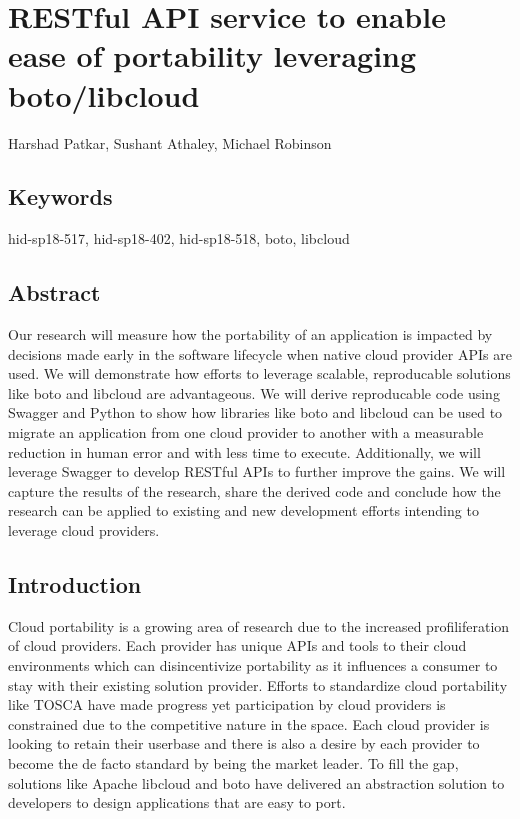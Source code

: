 \section{RESTful API service to enable ease of portability leveraging
boto/libcloud}\label{restful-api-service-to-enable-ease-of-portability-leveraging-botolibcloud}

Harshad Patkar, Sushant Athaley, Michael Robinson

\subsection{Keywords}\label{keywords}

hid-sp18-517, hid-sp18-402, hid-sp18-518, boto, libcloud

\subsection{Abstract}\label{abstract}

Our research will measure how the portability of an application is
impacted by decisions made early in the software lifecycle when native
cloud provider APIs are used. We will demonstrate how efforts to
leverage scalable, reproducable solutions like boto and libcloud are
advantageous. We will derive reproducable code using Swagger and Python
to show how libraries like boto and libcloud can be used to migrate an
application from one cloud provider to another with a measurable
reduction in human error and with less time to execute. Additionally, we
will leverage Swagger to develop RESTful APIs to further improve the
gains. We will capture the results of the research, share the derived
code and conclude how the research can be applied to existing and new
development efforts intending to leverage cloud providers.

\subsection{Introduction}\label{introduction}

Cloud portability is a growing area of research due to the increased
profiliferation of cloud providers. Each provider has unique APIs and
tools to their cloud environments which can disincentivize portability
as it influences a consumer to stay with their existing solution
provider. Efforts to standardize cloud portability like TOSCA have made
progress yet participation by cloud providers is constrained due to the
competitive nature in the space. Each cloud provider is looking to
retain their userbase and there is also a desire by each provider to
become the de facto standard by being the market leader. To fill the
gap, solutions like Apache libcloud and boto have delivered an
abstraction solution to developers to design applications that are easy
to port.

